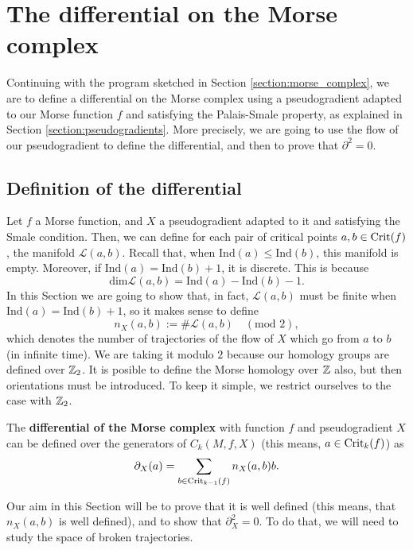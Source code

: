 \section{The differential on the Morse complex} \label{section:morse_differential}

Continuing with the program sketched in Section \ref{section:morse_complex}, we are to define a differential on the Morse complex using a pseudogradient adapted to our Morse function $f$ and satisfying the Palais-Smale property, as explained in Section \ref{section:pseudogradients}. More precisely, we are going to use the flow of our pseudogradient to define the differential, and then to prove that $\partial^2 = 0$.

\subsection{Definition of the differential}

Let $f$ a Morse function, and $X$ a pseudogradient adapted to it and satisfying the Smale condition. Then, we can define for each pair of critical points $a, b \in \mathrm{Crit}(f)$, the manifold $\mathcal{L}(a,b)$. Recall that, when $\text{Ind}(a) \leq \text{Ind}(b)$, this manifold is empty. Moreover, if $\text{Ind}(a) = \text{Ind}(b) + 1$, it is discrete. This is because
\[\text{dim} \mathcal{L}(a,b) = \text{Ind}(a) - \text{Ind}(b) - 1 .\]
In this Section we are going to show that, in fact, $\mathcal{L}(a,b)$ must be finite when $\text{Ind}(a) = \text{Ind}(b) + 1$, so it makes sense to define
\[n_X(a,b) := \# \mathcal{L}(a,b) \quad (\text{mod } 2),\]
which denotes the number of trajectories of the flow of $X$ which go from $a$ to $b$ (in infinite time). We are taking it modulo $2$ because our homology groups are defined over $\mathbb{Z}_2$. It is posible to define the Morse homology over $\mathbb{Z}$ also, but then orientations must be introduced. To keep it simple, we restrict ourselves to the case with $\mathbb{Z}_2$.

\begin{deff}
The {\bf differential of the Morse complex} with function $f$ and pseudogradient $X$ can be defined over the generators of $C_k(M,f,X)$ (this means, $a \in \mathrm{Crit}_k(f)$) as
\begin{displaymath}
\partial_X (a) = \sum_{b \in \mathrm{Crit}_{k-1}(f)} n_X(a,b) b .
\end{displaymath}
\end{deff}

Our aim in this Section will be to prove that it is well defined (this means, that $n_X(a,b)$ is well defined), and to show that $\partial_X^2 = 0$. To do that, we will need to study the space of broken trajectories.

